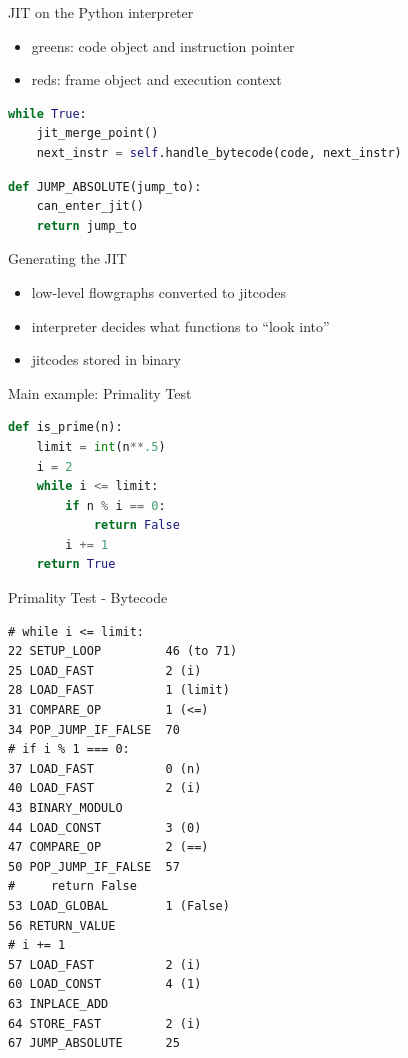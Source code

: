 \documentclass[14pt]{beamer}
\begin{document}
\begin{frame}[fragile]{JIT on the Python interpreter}
\begin{itemize}
\item greens: code object and instruction pointer
\item reds: frame object and execution context
\end{itemize}
\begin{lstlisting}[language=Python]
while True:
    jit_merge_point()
    next_instr = self.handle_bytecode(code, next_instr)
\end{lstlisting}
\begin{lstlisting}[language=Python]
def JUMP_ABSOLUTE(jump_to):
    can_enter_jit()
    return jump_to
\end{lstlisting}
\end{frame}

\begin{frame}{Generating the JIT}
\begin{itemize}
\item low-level flowgraphs converted to jitcodes
\item interpreter decides what functions to ``look into''
\item jitcodes stored in binary
\end{itemize}
\end{frame}

\begin{frame}[fragile]{Main example: Primality Test}
\begin{lstlisting}[language=Python]
def is_prime(n):
    limit = int(n**.5)
    i = 2
    while i <= limit:
        if n % i == 0:
            return False
        i += 1
    return True
\end{lstlisting}
\end{frame}

\begin{frame}[fragile]{Primality Test - Bytecode}
\tiny{
\begin{verbatim}
# while i <= limit:
22 SETUP_LOOP         46 (to 71)
25 LOAD_FAST          2 (i)
28 LOAD_FAST          1 (limit)
31 COMPARE_OP         1 (<=)
34 POP_JUMP_IF_FALSE  70
# if i % 1 === 0:
37 LOAD_FAST          0 (n)
40 LOAD_FAST          2 (i)
43 BINARY_MODULO       
44 LOAD_CONST         3 (0)
47 COMPARE_OP         2 (==)
50 POP_JUMP_IF_FALSE  57
#     return False
53 LOAD_GLOBAL        1 (False)
56 RETURN_VALUE        
# i += 1
57 LOAD_FAST          2 (i)
60 LOAD_CONST         4 (1)
63 INPLACE_ADD         
64 STORE_FAST         2 (i)
67 JUMP_ABSOLUTE      25
\end{verbatim}
}
\end{frame}
\end{document}
